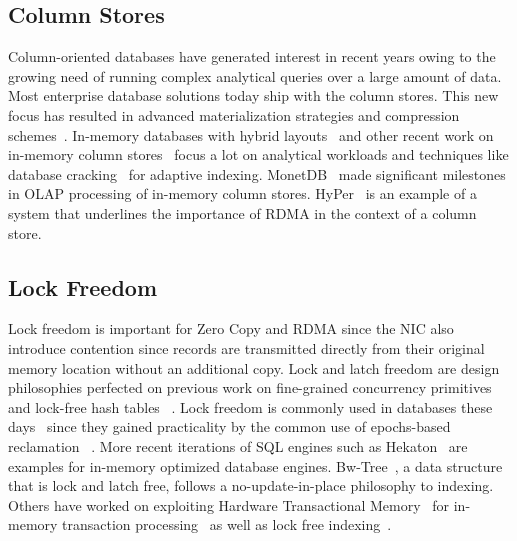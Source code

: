 \subsection{Column Stores}
Column-oriented databases have generated interest in recent years owing to the growing 
need of running complex analytical queries over a large amount of data. Most enterprise 
database solutions today ship with the column stores. This new focus has resulted 
in advanced materialization strategies and compression schemes~\cite{cstore,cstorevsrowstore,cstore-material,cstorecompression}.
In-memory databases with hybrid layouts~\cite{hybridinmemorycolstore} and other recent work on in-memory column stores~\cite{inmemorycracking} 
focus a lot on analytical workloads and techniques like database cracking~\cite{databasecracking} for adaptive indexing. 
MonetDB~\cite{monetdb} made significant milestones in OLAP processing of in-memory column stores. HyPer~\cite{hyperhybrid} 
is an example of a system that underlines the importance of RDMA in the context of a column store.


\subsection{Lock Freedom}
Lock freedom is important for Zero Copy and RDMA since the NIC also introduce contention 
since records are transmitted directly from their original memory location without an 
additional copy. Lock and latch freedom are 
design philosophies perfected on previous work on fine-grained concurrency 
primitives~\cite{finegrained} and lock-free hash tables ~\cite{lockfreeht}. Lock freedom is commonly
used in databases these days~\cite{htm} since they gained practicality by the common use of
epochs-based reclamation~\cite{lockfreedom} . 
More recent iterations of SQL engines such as Hekaton~\cite{hekaton} are 
examples for in-memory optimized  database engines. Bw-Tree~\cite{bw-tree}, a 
data structure that is lock and latch free, follows a no-update-in-place philosophy to indexing.
Others have worked on exploiting Hardware Transactional Memory~\cite{htm-old}
for in-memory transaction processing~\cite{drtm} as well as lock free indexing~\cite{htm}.

